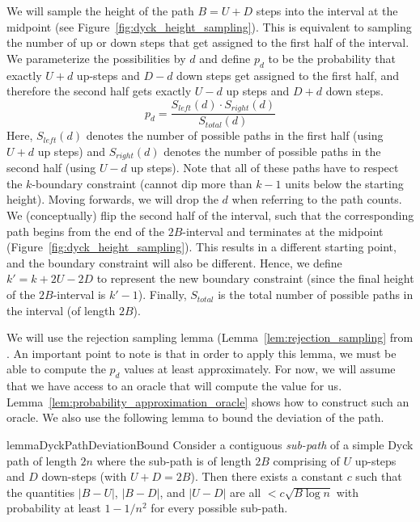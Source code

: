 We will sample the height of the path $B = U+D$ steps into the interval at the midpoint (see Figure~\ref{fig:dyck_height_sampling}).
This is equivalent to sampling the number of up or down steps that get assigned to the first half of the interval.
We parameterize the possibilities by $d$ and define $p_d$ to be the probability that exactly $U+d$ up-steps and $D-d$ down steps
get assigned to the first half, and therefore the second half gets exactly $U-d$ up steps and $D+d$ down steps.
\[
p_d = \frac{S_{left}(d)\cdot S_{right}(d)}{S_{total}(d)}
\]
Here, $S_{left}(d)$ denotes the number of possible paths in the first half (using $U+d$ up steps)
and $S_{right}(d)$ denotes the number of possible paths in the second half (using $U-d$ up steps).
Note that all of these paths have to respect the $k$-boundary constraint (cannot dip more than $k-1$ units below the starting height).
Moving forwards, we will drop the $d$ when referring to the path counts.
We (conceptually) flip the second half of the interval,
such that the corresponding path begins from the end of the $2B$-interval and terminates at the midpoint (Figure~\ref{fig:dyck_height_sampling}).
This results in a different starting point, and the boundary constraint will also be different.
Hence, we define $k' = k + 2U - 2D$  to represent the new boundary constraint (since the final height of the $2B$-interval is $k'-1$).
Finally, $S_{total}$ is the total number of possible paths in the interval (of length $2B$).

We will use the rejection sampling lemma (Lemma~\ref{lem:rejection_sampling} from \cite{huge}.
An important point to note is that in order to apply this lemma, we must be able to compute the $p_d$ values at least approximately.
For now, we will assume that we have access to an oracle that will compute the value for us.
Lemma~\ref{lem:probability_approximation_oracle} shows how to construct such an oracle.
We also use the following lemma to bound the deviation of the path.
\begin{restatable}{lemma}{DyckPathDeviationBound}
\label{lem:DyckPathDeviationBound}
Consider a contiguous \emph{sub-path} of a simple Dyck path of length $2n$
where the sub-path is of length $2B$ comprising of $U$ up-steps and $D$ down-steps (with $U + D = 2B$).
Then there exists a constant $c$ such that the quantities $|B-U|$, $|B-D|$, and $|U-D|$
are all $<c\sqrt{B\log n}$ with probability at least $1-1/n^2$ for every possible sub-path.
\end{restatable}


